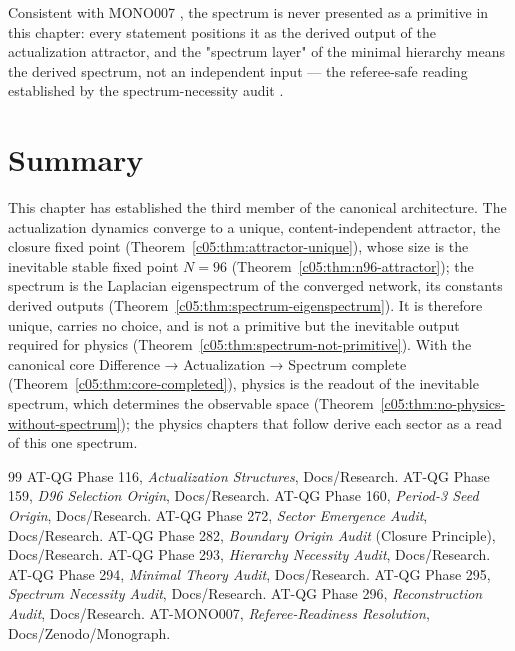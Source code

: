 Consistent with MONO007 \cite{c05:MONO007}, the spectrum is never presented as a primitive in
this chapter: every statement positions it as the derived output of the actualization
attractor, and the "spectrum layer" of the minimal hierarchy means the derived spectrum, not
an independent input --- the referee-safe reading established by the spectrum-necessity audit
\cite{c05:QG295}.

\section{Summary}
\label{c05:sec:spectrum-summary}

This chapter has established the third member of the canonical architecture. The
actualization dynamics converge to a unique, content-independent attractor, the closure
fixed point (Theorem~\ref{c05:thm:attractor-unique}), whose size is the inevitable stable
fixed point $N=96$ (Theorem~\ref{c05:thm:n96-attractor}); the spectrum is the Laplacian
eigenspectrum of the converged network, its constants derived outputs
(Theorem~\ref{c05:thm:spectrum-eigenspectrum}). It is therefore unique, carries no choice,
and is not a primitive but the inevitable output required for physics
(Theorem~\ref{c05:thm:spectrum-not-primitive}). With the canonical core Difference →
Actualization → Spectrum complete (Theorem~\ref{c05:thm:core-completed}), physics is the
readout of the inevitable spectrum, which determines the observable space
(Theorem~\ref{c05:thm:no-physics-without-spectrum}); the physics chapters that follow derive
each sector as a read of this one spectrum.

\begin{thebibliography}{99}
 AT-QG Phase 116, \emph{Actualization Structures}, Docs/Research.
 AT-QG Phase 159, \emph{D96 Selection Origin}, Docs/Research.
 AT-QG Phase 160, \emph{Period-3 Seed Origin}, Docs/Research.
 AT-QG Phase 272, \emph{Sector Emergence Audit}, Docs/Research.
 AT-QG Phase 282, \emph{Boundary Origin Audit} (Closure Principle), Docs/Research.
 AT-QG Phase 293, \emph{Hierarchy Necessity Audit}, Docs/Research.
 AT-QG Phase 294, \emph{Minimal Theory Audit}, Docs/Research.
 AT-QG Phase 295, \emph{Spectrum Necessity Audit}, Docs/Research.
 AT-QG Phase 296, \emph{Reconstruction Audit}, Docs/Research.
 AT-MONO007, \emph{Referee-Readiness Resolution}, Docs/Zenodo/Monograph.
\end{thebibliography}
